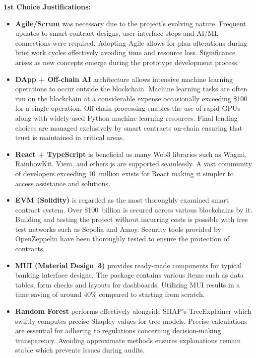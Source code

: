 \documentclass[12pt,a4paper]{report}
\begin{document}
\textbf{1st Choice Justifications:}

\begin{itemize}[noitemsep]
\item \textbf{Agile/Scrum} was necessary due to the project's evolving nature. Frequent updates to smart contract designs, user interface steps and AI/ML connections were required. Adopting Agile allows for plan alterations during brief work cycles effectively avoiding time and resource loss. Significance arises as new concepts emerge during the prototype development process.

\item \textbf{DApp + Off-chain AI} architecture allows intensive machine learning operations to occur outside the blockchain. Machine learning tasks are often run on the blockchain at a considerable expense occasionally exceeding \$100 for a single operation. Off-chain processing enables the use of rapid GPUs along with widely-used Python machine learning resources. Final lending choices are managed exclusively by smart contracts on-chain ensuring that trust is maintained in critical areas.

\item \textbf{React + TypeScript} is beneficial as many Web3 libraries such as Wagmi, RainbowKit, Viem, and ethers.js are supported seamlessly. A vast community of developers exceeding 10~million exists for React making it simpler to access assistance and solutions.

\item \textbf{EVM (Solidity)} is regarded as the most thoroughly examined smart contract system. Over \$100~billion is secured across various blockchains by it. Building and testing the project without incurring costs is possible with free test networks such as Sepolia and Amoy. Security tools provided by OpenZeppelin have been thoroughly tested to ensure the protection of contracts.

\item \textbf{MUI (Material Design~3)} provides ready-made components for typical banking interface designs. The package contains various items such as data tables, form checks and layouts for dashboards. Utilizing MUI results in a time saving of around 40\% compared to starting from scratch.

\item \textbf{Random Forest} performs effectively alongside SHAP's TreeExplainer which swiftly computes precise Shapley values for tree models. Precise calculations are essential for adhering to regulations concerning decision-making transparency. Avoiding approximate methods ensures explanations remain stable which prevents issues during audits.


\end{itemize}
\end{document}
